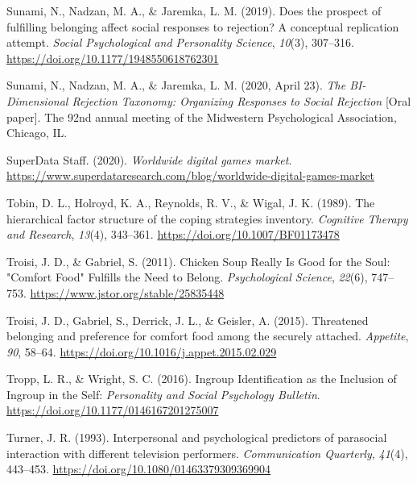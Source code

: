 \documentclass[
]{udthesis}
\newlength{\cslhangindent}
\newenvironment{CSLReferences}[2] %
 {\begin{list}{}{%
  \setlength{\itemindent}{0pt}
  \setlength{\leftmargin}{0pt}
  \setlength{\parsep}{0pt}
  \ifodd #1
   \setlength{\leftmargin}{\cslhangindent}
   \setlength{\itemindent}{-1\cslhangindent}
  \fi
  \setlength{\itemsep}{#2\baselineskip}}}
 {\end{list}}
\begin{document}
\begin{CSLReferences}{1}{0}
Sunami, N., Nadzan, M. A., \& Jaremka, L. M. (2019). Does the prospect of fulfilling belonging affect social responses to rejection? {A} conceptual replication attempt. \emph{Social Psychological and Personality Science}, \emph{10}(3), 307--316. \url{https://doi.org/10.1177/1948550618762301}

Sunami, N., Nadzan, M. A., \& Jaremka, L. M. (2020, April 23). \emph{The {BI}-{Dimensional Rejection Taxonomy}: {Organizing Responses} to {Social Rejection}} {[}Oral paper{]}. The 92nd annual meeting of the {Midwestern Psychological Association}, {Chicago, IL}.

SuperData Staff. (2020). \emph{Worldwide digital games market}. \url{https://www.superdataresearch.com/blog/worldwide-digital-games-market}

Tobin, D. L., Holroyd, K. A., Reynolds, R. V., \& Wigal, J. K. (1989). The hierarchical factor structure of the coping strategies inventory. \emph{Cognitive Therapy and Research}, \emph{13}(4), 343--361. \url{https://doi.org/10.1007/BF01173478}

Troisi, J. D., \& Gabriel, S. (2011). Chicken {Soup Really Is Good} for the {Soul}: {"}{Comfort Food}{"} {Fulfills} the {Need} to {Belong}. \emph{Psychological Science}, \emph{22}(6), 747--753. \url{https://www.jstor.org/stable/25835448}

Troisi, J. D., Gabriel, S., Derrick, J. L., \& Geisler, A. (2015). Threatened belonging and preference for comfort food among the securely attached. \emph{Appetite}, \emph{90}, 58--64. \url{https://doi.org/10.1016/j.appet.2015.02.029}

Tropp, L. R., \& Wright, S. C. (2016). Ingroup {Identification} as the {Inclusion} of {Ingroup} in the {Self}: \emph{Personality and Social Psychology Bulletin}. \url{https://doi.org/10.1177/0146167201275007}

Turner, J. R. (1993). Interpersonal and psychological predictors of parasocial interaction with different television performers. \emph{Communication Quarterly}, \emph{41}(4), 443--453. \url{https://doi.org/10.1080/01463379309369904}


\end{CSLReferences}
\end{document}
